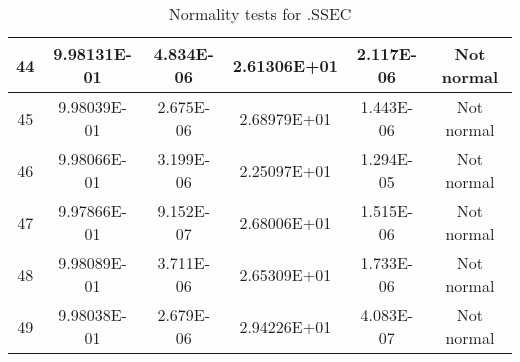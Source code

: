 \begin{table}[h]
\begin{tabular}{|c|c|c|c|c|c|}
		44 & 9.98131E-01 & 4.834E-06 & 2.61306E+01 & 2.117E-06 & Not normal\\\hline
		45 & 9.98039E-01 & 2.675E-06 & 2.68979E+01 & 1.443E-06 & Not normal\\\hline
		46 & 9.98066E-01 & 3.199E-06 & 2.25097E+01 & 1.294E-05 & Not normal\\\hline
		47 & 9.97866E-01 & 9.152E-07 & 2.68006E+01 & 1.515E-06 & Not normal\\\hline
		48 & 9.98089E-01 & 3.711E-06 & 2.65309E+01 & 1.733E-06 & Not normal\\\hline
		49 & 9.98038E-01 & 2.679E-06 & 2.94226E+01 & 4.083E-07 & Not normal\\\hline
	\end{tabular}
	\caption{Normality tests for .SSEC}
	\label{tab:normality_tests_SSEC}
\end{table}
